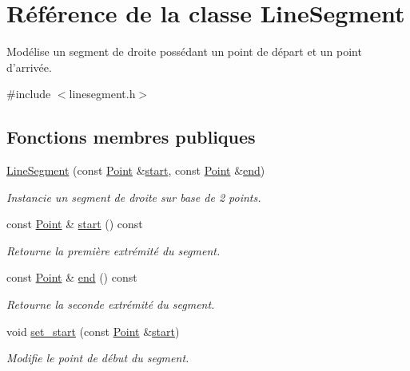 \hypertarget{classLineSegment}{\section{Référence de la classe Line\+Segment}
\label{classLineSegment}
}


Modélise un segment de droite possédant un point de départ et un point d'arrivée.  




{\ttfamily \#include $<$linesegment.\+h$>$}

\subsection*{Fonctions membres publiques}
\begin{DoxyCompactItemize}
\item 
\hyperlink{classLineSegment_a3873183b7bae15250c6d616247cd099b}{Line\+Segment} (const \hyperlink{classPoint}{Point} \&\hyperlink{classLineSegment_af9a830ffa92f1b2e8c6138e023efbf1e}{start}, const \hyperlink{classPoint}{Point} \&\hyperlink{classLineSegment_a0852438c18570f230b6c6be1571b9460}{end})
\begin{DoxyCompactList}\small\item\em Instancie un segment de droite sur base de 2 points. \end{DoxyCompactList}\item 
const \hyperlink{classPoint}{Point} \& \hyperlink{classLineSegment_af9a830ffa92f1b2e8c6138e023efbf1e}{start} () const 
\begin{DoxyCompactList}\small\item\em Retourne la première extrémité du segment. \end{DoxyCompactList}\item 
const \hyperlink{classPoint}{Point} \& \hyperlink{classLineSegment_a0852438c18570f230b6c6be1571b9460}{end} () const 
\begin{DoxyCompactList}\small\item\em Retourne la seconde extrémité du segment. \end{DoxyCompactList}\item 
void \hyperlink{classLineSegment_adb965beb1d587a3aa16714bcf0d1dbad}{set\+\_\+start} (const \hyperlink{classPoint}{Point} \&\hyperlink{classLineSegment_af9a830ffa92f1b2e8c6138e023efbf1e}{start})
\begin{DoxyCompactList}\small\item\em Modifie le point de début du segment. \end{DoxyCompactList}\item 

\end{DoxyCompactItemize}
